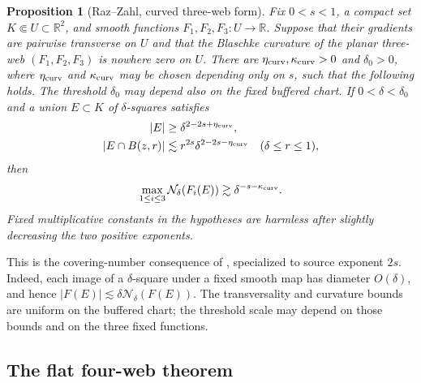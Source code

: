 \documentclass[11pt]{article}
\newtheorem{proposition}[theorem]{Proposition}
\begin{document}
\begin{proposition}[Raz--Zahl, curved three-web form]
\label{prop:RZ-curved}
Fix \(0<s<1\), a compact set \(K\Subset U\subset\mathbb R^2\), and
smooth functions \(F_1,F_2,F_3:U\to\mathbb R\).  Suppose that their
gradients are pairwise transverse on \(U\) and that the Blaschke
curvature of the planar three-web
\((F_1,F_2,F_3)\) is nowhere zero on \(U\).  There are
\(\eta_{\rm curv},\kappa_{\rm curv}>0\) and \(\delta_0>0\),
where \(\eta_{\rm curv}\) and \(\kappa_{\rm curv}\) may be chosen
depending only on \(s\), such that the following holds.  The
threshold \(\delta_0\) may depend also on the fixed buffered chart.
If \(0<\delta<\delta_0\) and a union
\(E\subset K\) of \(\delta\)-squares satisfies
\begin{align}
 |E|&\ge\delta^{2-2s+\eta_{\rm curv}},
 \label{eq:RZ-curved-size}\\
 |E\cap B(z,r)|
 &\lesssim r^{2s}\delta^{2-2s-\eta_{\rm curv}}
 \quad(\delta\le r\le1),
 \label{eq:RZ-curved-NC}
\end{align}
then
\begin{equation}
 \max_{1\le i\le3}\mathcal N_\delta(F_i(E))
 \gtrsim\delta^{-s-\kappa_{\rm curv}}.
 \label{eq:RZ-curved-conclusion}
\end{equation}
Fixed multiplicative constants in the hypotheses are harmless after
slightly decreasing the two positive exponents.
\end{proposition}

This is the covering-number consequence of
\cite[Theorem~1.11]{RZ}, specialized to source exponent \(2s\).
Indeed, each image of a \(\delta\)-square under a fixed smooth map has
diameter \(O(\delta)\), and hence
\(|F(E)|\lesssim\delta\mathcal N_\delta(F(E))\).
The transversality and curvature bounds are uniform on the buffered
chart; the threshold scale may depend on those bounds and on the
three fixed functions.

\subsection{The flat four-web theorem}
\end{document}
